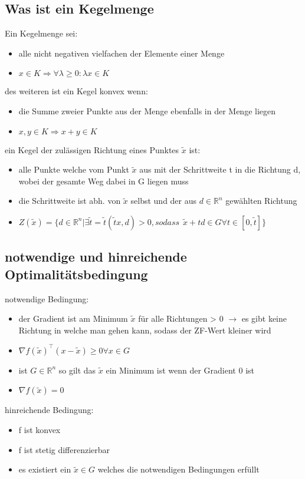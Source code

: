 \documentclass[12pt,a4paper, hyperref]{article}
\newcommand{\tsnake}[1]{\ensuremath{\tilde{#1}}}
\begin{document}
\subsection{Was ist ein Kegelmenge}
Ein Kegelmenge sei:
\begin{itemize}
\item alle nicht negativen vielfachen der Elemente einer Menge
\item $x \in K \Rightarrow \forall\lambda\geq 0: \lambda x \in K$
\end{itemize}
des weiteren ist ein Kegel konvex wenn:
\begin{itemize}
\item die Summe zweier Punkte aus der Menge ebenfalls in der Menge liegen
\item $x, y \in K \Rightarrow x+y \in K$
\end{itemize}
ein Kegel der zulässigen Richtung eines Punktes \tsnake x ist:
\begin{itemize}
\item alle Punkte welche vom Punkt \tsnake x aus mit der Schrittweite t in die Richtung d, wobei der gesamte Weg dabei in G liegen muss
\item die Schrittweite ist abh. von \tsnake x selbst und der aus $d \in \mathbb{R}^n$ gewählten Richtung
\item $Z(\tilde{x}) = \{d \in \mathbb{R}^n | \exists \tilde{t} = \tsnake t (\tilde{t} x ,d) >0, sodass \hspace{5pt} \tilde{x} + td \in G \forall t \in [0, \tilde{t} ]\}$
\end{itemize}

\subsection{notwendige und hinreichende Optimalitätsbedingung}
notwendige Bedingung:
\begin{itemize}
\item der Gradient ist am Minimum \tsnake x für alle Richtungen > 0 $\rightarrow$ es gibt keine Richtung in welche man gehen kann, sodass der ZF-Wert kleiner wird
\item $\nabla f(\tilde{x})^\intercal (x-\tilde{x}) \geq 0 \forall x \in G$
\item ist $G \in \mathbb{R}^n$ so gilt das \tsnake x ein Minimum ist wenn der Gradient 0 ist
\item $\nabla f(\tilde{x}) = 0$
\end{itemize}

\flushleft hinreichende Bedingung:
\begin{itemize}
\item f ist konvex
\item f ist stetig differenzierbar
\item es existiert ein $\tilde{x} \in G$ welches die notwendigen Bedingungen erfüllt
\end{itemize}
\end{document}
